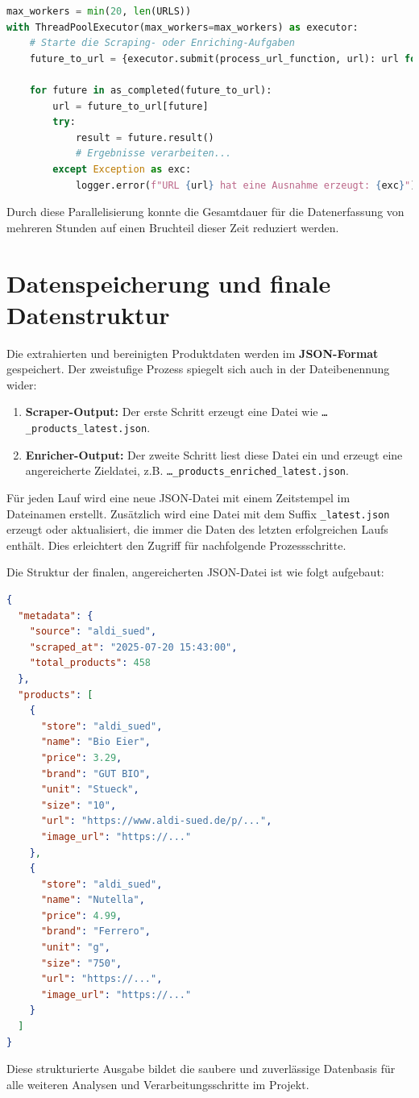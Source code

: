 \documentclass[12pt, a4paper]{report} %
\begin{document}
\begin{lstlisting}[language=Python, caption={Parallele Ausführung mit ThreadPoolExecutor}]
max_workers = min(20, len(URLS))
with ThreadPoolExecutor(max_workers=max_workers) as executor:
    # Starte die Scraping- oder Enriching-Aufgaben
    future_to_url = {executor.submit(process_url_function, url): url for url in URLS}
    
    for future in as_completed(future_to_url):
        url = future_to_url[future]
        try:
            result = future.result()
            # Ergebnisse verarbeiten...
        except Exception as exc:
            logger.error(f"URL {url} hat eine Ausnahme erzeugt: {exc}")
\end{lstlisting}
Durch diese Parallelisierung konnte die Gesamtdauer für die Datenerfassung von mehreren Stunden auf einen Bruchteil dieser Zeit reduziert werden.

\section{Datenspeicherung und finale Datenstruktur}
\label{sec:scraping_datenspeicherung}
Die extrahierten und bereinigten Produktdaten werden im \textbf{JSON-Format} gespeichert. Der zweistufige Prozess spiegelt sich auch in der Dateibenennung wider:
\begin{enumerate}
    \item \textbf{Scraper-Output:} Der erste Schritt erzeugt eine Datei wie \texttt{\ldots\_products\_latest.json}.
    \item \textbf{Enricher-Output:} Der zweite Schritt liest diese Datei ein und erzeugt eine angereicherte Zieldatei, z.B. \texttt{\ldots\_products\_enriched\_latest.json}.
\end{enumerate}

Für jeden Lauf wird eine neue JSON-Datei mit einem Zeitstempel im Dateinamen erstellt. Zusätzlich wird eine Datei mit dem Suffix \texttt{\_latest.json} erzeugt oder aktualisiert, die immer die Daten des letzten erfolgreichen Laufs enthält. Dies erleichtert den Zugriff für nachfolgende Prozessschritte.

Die Struktur der finalen, angereicherten JSON-Datei ist wie folgt aufgebaut:
\begin{lstlisting}[language=JSON, caption={Beispielhafte JSON-Struktur der finalen Ausgabedatei}]
{
  "metadata": {
    "source": "aldi_sued",
    "scraped_at": "2025-07-20 15:43:00",
    "total_products": 458
  },
  "products": [
    {
      "store": "aldi_sued",
      "name": "Bio Eier",
      "price": 3.29,
      "brand": "GUT BIO",
      "unit": "Stueck",
      "size": "10",
      "url": "https://www.aldi-sued.de/p/...",
      "image_url": "https://..."
    },
    {
      "store": "aldi_sued",
      "name": "Nutella",
      "price": 4.99,
      "brand": "Ferrero",
      "unit": "g",
      "size": "750",
      "url": "https://...",
      "image_url": "https://..."
    }
  ]
}
\end{lstlisting}
Diese strukturierte Ausgabe bildet die saubere und zuverlässige Datenbasis für alle weiteren Analysen und Verarbeitungsschritte im Projekt.
\end{document}

